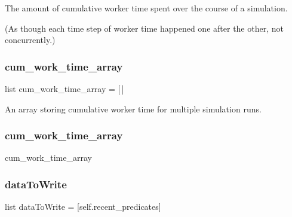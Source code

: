 The amount of cumulative worker time spent over the course of a simulation. 

(As though each time step of worker time happened one after the other, not concurrently.) \mbox{\label{classdynamicfilterapp_1_1test__simulations_1_1_simulation_test_a7649734a340929740a348ac52178ff96}} 
\subsubsection{\texorpdfstring{cum\_work\_time\_array}{cum\_work\_time\_array}\hspace{0.1cm}{\footnotesize\ttfamily [1/2]}}
{\footnotesize\ttfamily list cum\+\_\+work\+\_\+time\+\_\+array = \mbox{[}$\,$\mbox{]}\hspace{0.3cm}{\ttfamily [static]}}



An array storing cumulative worker time for multiple simulation runs. 

\mbox{\label{classdynamicfilterapp_1_1test__simulations_1_1_simulation_test_a68c455ec36daff5474680966121f2dd8}} 
\subsubsection{\texorpdfstring{cum\_work\_time\_array}{cum\_work\_time\_array}\hspace{0.1cm}{\footnotesize\ttfamily [2/2]}}
{\footnotesize\ttfamily cum\+\_\+work\+\_\+time\+\_\+array}

\mbox{\label{classdynamicfilterapp_1_1test__simulations_1_1_simulation_test_a213f043d9f337910e40da2aac8b37a87}} 
\subsubsection{\texorpdfstring{dataToWrite}{dataToWrite}}
{\footnotesize\ttfamily list data\+To\+Write = \mbox{[}self.\+recent\+\_\+predicates\mbox{]}\hspace{0.3cm}{\ttfamily [static]}}

